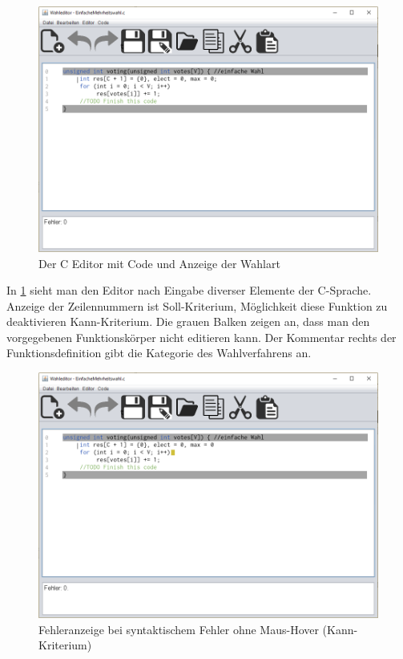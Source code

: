 \documentclass[a4paper]{scrreprt}
\begin{document}
\begin{figure}[H]
\includegraphics[scale=0.4]{Editor-mit-text.png}
\caption{Der C Editor mit Code und Anzeige der Wahlart}
\label{Editor-mit-text}
\end{figure}

In \ref{Editor-mit-text} sieht man den Editor nach Eingabe diverser Elemente der C-Sprache. Anzeige der Zeilennummern ist Soll-Kriterium, Möglichkeit diese Funktion zu deaktivieren Kann-Kriterium. Die grauen Balken zeigen an, dass man den vorgegebenen Funktionskörper nicht editieren kann. Der Kommentar rechts der Funktionsdefinition gibt die Kategorie des Wahlverfahrens an.

\begin{figure}[H]
\includegraphics[scale=0.4]{Editor-mit-Fehler-ohne-hover.png}
\caption{Fehleranzeige bei syntaktischem Fehler ohne Maus-Hover (Kann-Kriterium)}
\label{Editor-mit-Fehler-ohne-hover}
\end{figure}
\end{document}
